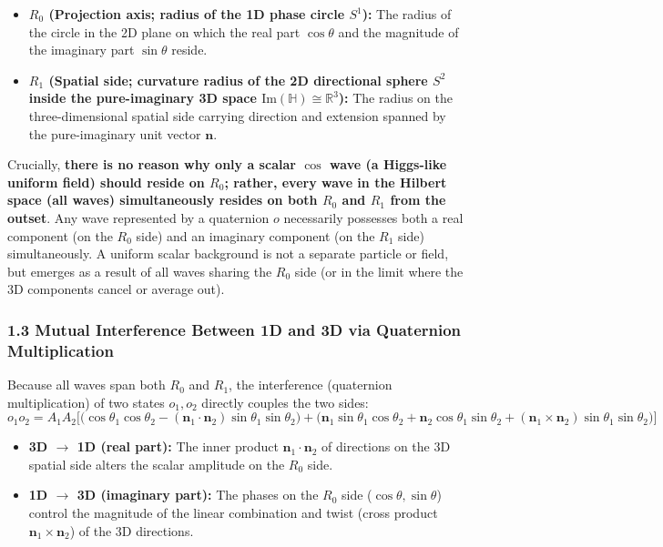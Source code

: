 \documentclass[
  a4paper,
]{article}
\providecommand{\tightlist}{%
  \setlength{\itemsep}{0pt}\setlength{\parskip}{0pt}}
\begin{document}
\begin{itemize}
\tightlist
\item
  \textbf{\(R_0\) (Projection axis; radius of the 1D phase circle
  \(S^1\)):} The radius of the circle in the 2D plane on which the real
  part \(\cos\theta\) and the magnitude of the imaginary part
  \(\sin\theta\) reside.
\item
  \textbf{\(R_1\) (Spatial side; curvature radius of the 2D directional
  sphere \(S^2\) inside the pure-imaginary 3D space
  \(\mathrm{Im}(\mathbb{H}) \cong \mathbb{R}^3\)):} The radius on the
  three-dimensional spatial side carrying direction and extension
  spanned by the pure-imaginary unit vector \(\mathbf{n}\).
\end{itemize}

Crucially, \textbf{there is no reason why only a scalar \(\cos\) wave (a
Higgs-like uniform field) should reside on \(R_0\); rather, every wave
in the Hilbert space (all waves) simultaneously resides on both \(R_0\)
and \(R_1\) from the outset}. Any wave represented by a quaternion \(o\)
necessarily possesses both a real component (on the \(R_0\) side) and an
imaginary component (on the \(R_1\) side) simultaneously. A uniform
scalar background is not a separate particle or field, but emerges as a
result of all waves sharing the \(R_0\) side (or in the limit where the
3D components cancel or average out).

\subsubsection{1.3 Mutual Interference Between 1D and 3D via Quaternion
Multiplication}\label{mutual-interference-between-1d-and-3d-via-quaternion-multiplication}

Because all waves span both \(R_0\) and \(R_1\), the interference
(quaternion multiplication) of two states \(o_1, o_2\) directly couples
the two sides:
\[o_1 o_2 = A_1 A_2 \Big[ \big(\cos\theta_1\cos\theta_2 - (\mathbf{n}_1\cdot\mathbf{n}_2)\sin\theta_1\sin\theta_2\big) + \big(\mathbf{n}_1\sin\theta_1\cos\theta_2 + \mathbf{n}_2\cos\theta_1\sin\theta_2 + (\mathbf{n}_1\times\mathbf{n}_2)\sin\theta_1\sin\theta_2\big) \Big]\]

\begin{itemize}
\tightlist
\item
  \textbf{3D \(\to\) 1D (real part):} The inner product
  \(\mathbf{n}_1 \cdot \mathbf{n}_2\) of directions on the 3D spatial
  side alters the scalar amplitude on the \(R_0\) side.
\item
  \textbf{1D \(\to\) 3D (imaginary part):} The phases on the \(R_0\)
  side (\(\cos\theta, \sin\theta\)) control the magnitude of the linear
  combination and twist (cross product
  \(\mathbf{n}_1 \times \mathbf{n}_2\)) of the 3D directions.
\end{itemize}
\end{document}
